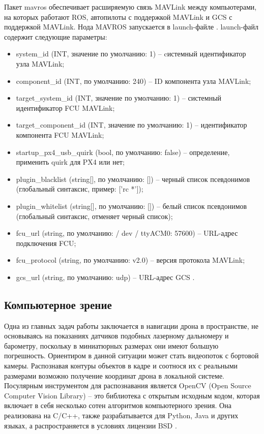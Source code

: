 Пакет mavros обеспечивает расширяемую связь MAVLink между компьютерами, на которых работают ROS, автопилоты с поддержкой MAVLink и GCS с поддержкой MAVLink. Нода MAVROS запускается в launch-файле \cite{clover}.
launch-файл содержит следующие параметры:
\begin{itemize}
\item  system\_id (INT, значение по умолчанию: 1) -- cистемный идентификатор узла MAVLink;

\item  component\_id (INT, по умолчанию: 240) -- ID компонента узла MAVLink;

\item  target\_system\_id (INT, значение по умолчанию: 1) -- системный идентификатор FCU MAVLink;

\item  target\_component\_id (INT, значение по умолчанию: 1) -- идентификатор компонента FCU MAVLink;

\item  startup\_px4\_usb\_quirk (bool, по умолчанию: false) -- определение, применить quirk для PX4 или нет;

\item  plugin\_blacklist (string[], по умолчанию: []) -- черный список псевдонимов (глобальный синтаксис, пример: ['rc *']);

\item  plugin\_whitelist (string[], по умолчанию: []) -- белый список псевдонимов (глобальный синтаксис, отменяет черный список);

\item  fcu\_url (string, по умолчанию: / dev / ttyACM0: 57600) -- URL-адрес подключения FCU;

\item  fcu\_protocol (string, по умолчанию: v2.0) -- версия протокола MAVLink;

\item  gcs\_url (string, по умолчанию: udp) -- URL-адрес GCS \cite{ros}.
\end{itemize}

\subsection{Компьютерное зрение}
Одна из главных задач работы заключается в навигации дрона в пространстве, не основываясь на показаниях датчиков подобных лазерному дальномеру и барометру, поскольку в миниатюрных размерах они имеют большую погрешность. Ориентиром в данной ситуации может стать видеопоток с бортовой камеры. Распознавая контуры объектов в кадре и соотнося их с реальными размерами возможно получение координат дрона в локальной системе. Посулярным инструментом для распознавания является OpenCV (Open Source Computer Vision Library) -- это библиотека с открытым исходным кодом, которая включает в себя несколько сотен алгоритмов компьютерного зрения. Она реализована на C/C++, также разрабатывается для Python, Java и других языках, а распространяется в условиях лицензии BSD \cite{opencv}.

